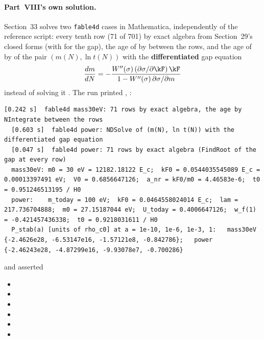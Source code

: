 \paragraph{Part~VIII's own solution.} Section~33 solves two \texttt{fable4d} cases in Mathematica,
independently of the reference script: every tenth row (71 of 701) by exact algebra from Section~29's closed
forms (with  for the gap), the age of  by  between the rows,
and the age of  by  of the pair $(m(N),\ln t(N))$ with the \textbf{differentiated}
gap equation
\[
  \frac{dm}{dN}=-\frac{W''(\sigma)\,(\partial\sigma/\partial\kF)\,\kF}{1-W''(\sigma)\,\partial\sigma/\partial m}
\]
instead of solving it . The run printed ,
:
\begin{Verbatim}[fontsize=\scriptsize]
  [0.242 s]  fable4d mass30eV: 71 rows by exact algebra, the age by NIntegrate between the rows
  [0.603 s]  fable4d power: NDSolve of (m(N), ln t(N)) with the differentiated gap equation
  [0.047 s]  fable4d power: 71 rows by exact algebra (FindRoot of the gap at every row)
  mass30eV: m0 = 30 eV = 12182.18122 E_c;  kF0 = 0.0544035545089 E_c = 0.00013397491 eV;  V0 = 0.6856647126;  a_nr = kF0/m0 = 4.46583e-6;  t0 = 0.951246513195 / H0
  power:    m_today = 100 eV;  kF0 = 0.0464558024014 E_c;  lam = 217.736704888;  m0 = 27.15187044 eV;  U_today = 0.4006647126;  w_f(1) = -0.421457436338;  t0 = 0.9218031611 / H0
  P_stab(a) [units of rho_c0] at a = 1e-10, 1e-6, 1e-3, 1:   mass30eV {-2.4626e28, -6.53147e16, -1.57121e8, -0.842786};   power {-2.46243e28, -4.87299e16, -9.93078e7, -0.700286}
\end{Verbatim}
and asserted 
\begin{itemize}
  \item {}
  \item {}
  \item {}
  \item {}
  \item {}
  \item {}
\end{itemize}
